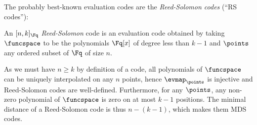 The probably best-known evaluation codes are the \emph{Reed-Solomon codes} (``RS codes''):

\begin{defi}
An $[n,k]_{\Fq}$ \emph{Reed-Solomon} code is an evaluation code obtained by taking $\funcspace$ to be the polynomials $\Fq[x]$
of degree less than $k-1$ and $\points$ any ordered subset of $\Fq$ of size $n$. 
\end{defi}

As we must have $n \geq k$ by definition of a code, all polynomials of $\funcspace$
can be uniquely interpolated on any $n$ points, hence $\evmap_\points$ is injective and Reed-Solomon codes are well-defined.
Furthermore, for any $\points$, any non-zero polynomial of $\funcspace$ is zero on at most $k - 1$ positions. The minimal distance of a Reed-Solomon code is thus $n - (k - 1)$, which makes them MDS codes.

